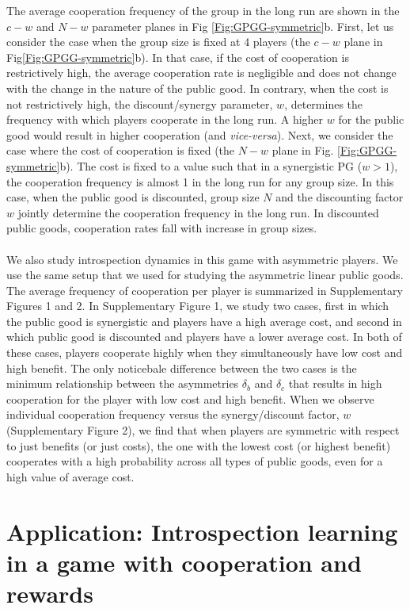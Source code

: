 \documentclass[11pt]{article}
\theoremstyle{plainCl1}
\theoremstyle{plainCl2}
\begin{document}
\noindent The average cooperation frequency of the group in the long run are shown in the $c-w$ and $N-w$ parameter planes in Fig \ref{Fig:GPGG-symmetric}b. First, let us consider the case when the group size is fixed at 4 players (the $c-w$ plane in Fig\ref{Fig:GPGG-symmetric}b). In that case, if the cost of cooperation is restrictively high, the average cooperation rate is negligible and does not change with the change in the nature of the public good. In contrary, when the cost is not restrictively high, the discount/synergy parameter, $w$, determines the frequency with which players cooperate in the long run. A higher $w$ for the public good would result in higher cooperation (and \emph{vice-versa}). Next, we consider the case where the cost of cooperation is fixed (the $N-w$ plane in Fig. \ref{Fig:GPGG-symmetric}b). The cost is fixed to a value such that in a synergistic PG ($w > 1$), the cooperation frequency is almost 1 in the long run for any group size. In this case, when the public good is discounted, group size $N$ and the discounting factor $w$ jointly determine the cooperation frequency in the long run. In discounted public goods, cooperation rates fall with increase in group sizes.\\ \\
\noindent 
We also study introspection dynamics in this game with asymmetric players. We use the same setup that we used for studying the asymmetric linear public goods. The average frequency of cooperation per player is summarized in Supplementary Figures 1 and 2. In Supplementary Figure 1, we study two cases, first in which the public good is synergistic and players have a high average cost, and second in which public good is discounted and players have a lower average cost. In both of these cases, players cooperate highly when they simultaneously have low cost and high benefit. The only noticebale difference between the two cases is the minimum relationship between the asymmetries $\delta_b$ and $\delta_c$ that results in high cooperation for the player with low cost and high benefit. When we observe individual cooperation frequency versus the synergy/discount factor, $w$ (Supplementary Figure 2), we find that when players are symmetric with respect to just benefits (or just costs), the one with the lowest cost (or highest benefit) cooperates with a high probability across all types of public goods, even for a high value of average cost.

\section*{Application: Introspection learning in a game with cooperation and rewards}
\end{document}

